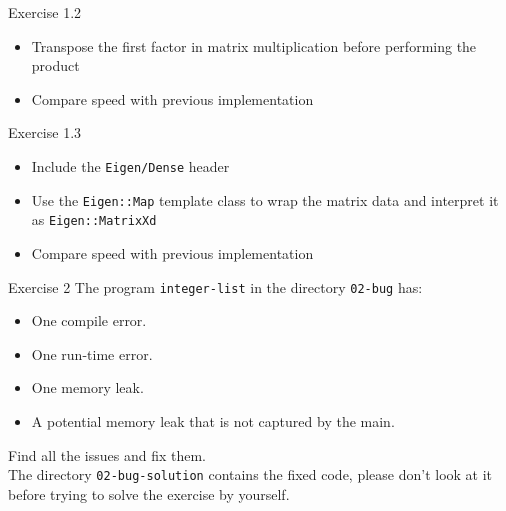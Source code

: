 \documentclass[10pt]{beamer}
\begin{document}
\begin{frame}{Exercise 1.2}

\begin{itemize}
\item Transpose the first factor in matrix multiplication before performing the product
\item Compare speed with previous implementation
\end{itemize}
\end{frame}

\begin{frame}{Exercise 1.3}

\begin{itemize}
\item Include the {\tt Eigen/Dense} header
\item Use the {\tt Eigen::Map} template class to wrap the matrix data and interpret it as {\tt Eigen::MatrixXd}
\item Compare speed with previous implementation
\end{itemize}
\end{frame}

\begin{frame}{Exercise 2}
The program \texttt{integer-list} in the directory \texttt{02-bug} has:

\begin{itemize}
    \item One compile error.
    \item One run-time error.
    \item One memory leak.
    \item A potential memory leak that is not captured by the main.
\end{itemize}

Find all the issues and fix them. \\
The directory \texttt{02-bug-solution} contains the fixed code,
please don't look at it before trying to solve the exercise by yourself.
\end{frame}
\end{document}
